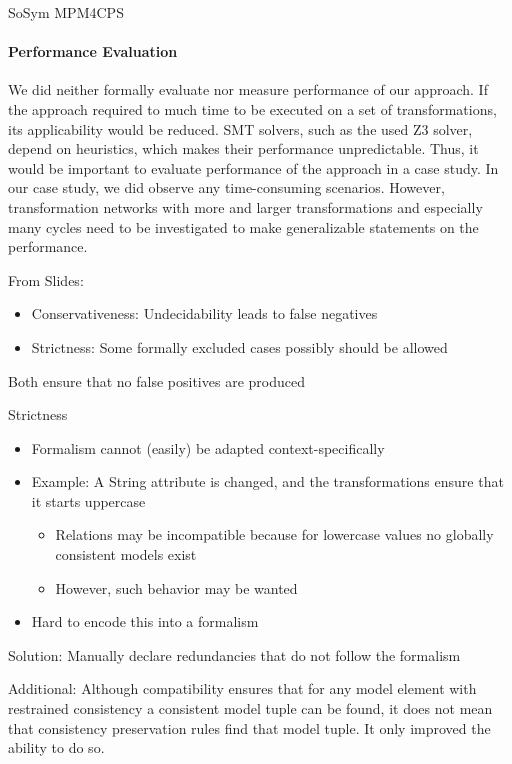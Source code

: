 \begin{copiedFrom}{SoSym MPM4CPS}
\paragraph{Performance Evaluation}
We did neither formally evaluate nor measure performance of our approach.
If the approach required to much time to be executed on a set of transformations, its applicability would be reduced.
SMT solvers, such as the used Z3 solver, depend on heuristics, which makes their performance unpredictable.
Thus, it would be important to evaluate performance of the approach in a case study.
In our case study, %
we did observe any time-consuming scenarios.
However, transformation networks with more and larger transformations and especially many cycles need to be investigated to make generalizable statements on the performance.


From Slides:
\begin{itemize}
    \item Conservativeness: Undecidability leads to false negatives
    \item Strictness: Some formally excluded cases possibly should be allowed
\end{itemize}
Both ensure that no false positives are produced

Strictness
\begin{itemize}
    \item Formalism cannot (easily) be adapted context-specifically
    \item Example: A String attribute is changed, and the transformations ensure that it starts uppercase
    \begin{itemize}
        \item Relations may be incompatible because for lowercase values no globally consistent models exist
        \item However, such behavior may be wanted
    \end{itemize}
    \item Hard to encode this into a formalism
\end{itemize}
Solution: Manually declare redundancies that do not follow the formalism

Additional:
Although compatibility ensures that for any model element with restrained consistency a consistent model tuple can be found, it does not mean that consistency preservation rules find that model tuple. It only improved the ability to do so.

\iffalse
Functional correctness:
    - Theoretical evaluation based on concepts and definitions of this paper
    -> Functioning of the procedure, algorithms
    
Applicability:
    - Empirical evaluation based on an implementation of the decomposition procedure
    - Interpretation of test results + metric achieved results against expected results
    -> Example scenarios, execution results
\fi

\end{copiedFrom} %




